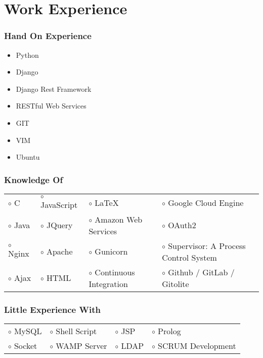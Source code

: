 \documentclass[10pt]{article}
\begin{document}
\section*{Work Experience}

\subsubsection*{Hand On Experience}

\begin{itemize}
 \item Python
 \item Django
 \item Django Rest Framework
 \item RESTful Web Services
 \item GIT
 \item VIM
 \item Ubuntu
\end{itemize}

\subsubsection*{Knowledge Of}

\begin{tabular}{l l l l}
 $\circ$ C &
 $\circ$ JavaScript &
 $\circ$ \LaTeX{} &
 $\circ$ Google Cloud Engine \\
 $\circ$ Java &
 $\circ$ JQuery &
 $\circ$ Amazon Web Services &
 $\circ$ OAuth2 \\
 $\circ$ Nginx &
 $\circ$ Apache &
 $\circ$ Gunicorn &
 $\circ$ Supervisor: A Process Control System \\
 $\circ$ Ajax &
 $\circ$ HTML &
 $\circ$ Continuous Integration &
 $\circ$ Github / GitLab / Gitolite \\
\end{tabular}

\subsubsection*{Little Experience With}

\begin{tabular}{l l l l}
 $\circ$ MySQL &
 $\circ$ Shell Script &
 $\circ$ JSP &
 $\circ$ Prolog \\
 $\circ$ Socket &
 $\circ$ WAMP Server &
 $\circ$ LDAP &
 $\circ$ SCRUM Development \\
\end{tabular}
\end{document}
